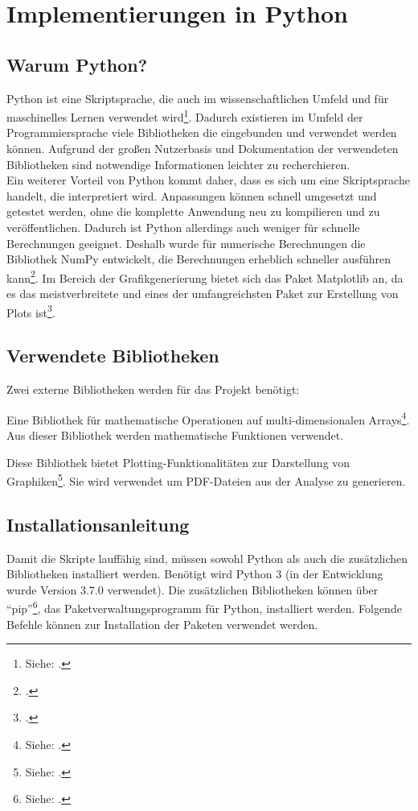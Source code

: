 \chapter{Implementierungen in Python}
\label{chp:python:implementation}

\section{Warum Python?}
Python ist eine Skriptsprache, die auch im wissenschaftlichen Umfeld und für maschinelles Lernen verwendet wird\footnote{Siehe: \cite{Fuxjaeger2017}.}.
Dadurch existieren im Umfeld der Programmiersprache viele Bibliotheken die eingebunden und verwendet werden können.
Aufgrund der großen Nutzerbasis und Dokumentation der verwendeten Bibliotheken sind notwendige Informationen leichter zu recherchieren.\\
Ein weiterer Vorteil von Python kommt daher, dass es sich um eine Skriptsprache handelt, die interpretiert wird.
Anpassungen können schnell umgesetzt und getestet werden, ohne die komplette Anwendung neu zu kompilieren und zu veröffentlichen.
Dadurch ist Python allerdings auch weniger für schnelle Berechnungen geeignet.
Deshalb wurde für numerische Berechnungen die Bibliothek NumPy entwickelt, die Berechnungen erheblich schneller ausführen kann\footnote{\cite[vgl.][S.173f]{Woyand2017}.}.
Im Bereich der Grafikgenerierung bietet sich das Paket Matplotlib an, da es das meistverbreitete und eines der umfangreichsten Paket zur Erstellung von Plots ist\footnote{\cite[vgl.][S.173f]{Rossant2013}.}.

\section{Verwendete Bibliotheken}
Zwei externe Bibliotheken werden für das Projekt benötigt:
\begin{description}[style=nextline]
	\item[NumPy] Eine Bibliothek für mathematische Operationen auf multi-dimensionalen Arrays\footnote{Siehe: \cite{Athanasias2014}.}. Aus dieser Bibliothek werden mathematische Funktionen verwendet.
	\item[Matplotlib] Diese Bibliothek bietet Plotting-Funktionalitäten zur Darstellung von Graphiken\footnote{Siehe: \cite{Matplotlib2019}.}. Sie wird verwendet um PDF-Dateien aus der Analyse zu generieren.
\end{description}
\section{Installationsanleitung}
Damit die Skripte lauffähig sind, müssen sowohl Python als auch die zusätzlichen Bibliotheken installiert werden.
Benötigt wird Python 3 (in der Entwicklung wurde Version 3.7.0 verwendet).
Die zusätzlichen Bibliotheken können über \enquote{pip}\footnote{Siehe: \cite{Foundation2019}.}, das Paketverwaltungsprogramm für Python, installiert werden. 
Folgende Befehle können zur Installation der Paketen verwendet werden.

